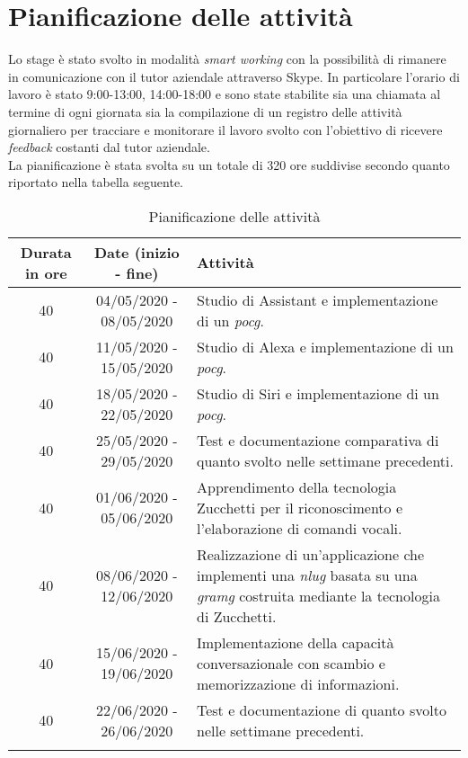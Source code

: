 \section{Pianificazione delle attività}
Lo stage è stato svolto in modalità \emph{smart working} con la possibilità di rimanere in comunicazione con il tutor aziendale attraverso Skype. In particolare l'orario di lavoro è stato 9:00-13:00, 14:00-18:00 e sono state stabilite sia una chiamata al termine di ogni giornata sia la compilazione di un registro delle attività giornaliero per tracciare e monitorare il lavoro svolto con l'obiettivo di ricevere \emph{feedback} costanti dal tutor aziendale. \\
La pianificazione è stata svolta su un totale di 320 ore suddivise secondo quanto riportato nella tabella seguente.
\begin{longtable}{|c|c|p{5.5cm}|}
		\hline
		\textbf{Durata in ore} & \textbf{Date (inizio - fine)} & \textbf{Attività} \\\hline
		
		40 & 04/05/2020 - 08/05/2020 & Studio di Assistant e implementazione di un \emph{\gls{pocg}}. \\
		\hline
		40 & 11/05/2020 - 15/05/2020 & Studio di Alexa e implementazione di un \emph{\gls{pocg}}. \\
		\hline
		40 & 18/05/2020 - 22/05/2020 & Studio di Siri e implementazione di un \emph{\gls{pocg}}. \\
		\hline
		40 & 25/05/2020 - 29/05/2020 & Test e documentazione comparativa di quanto svolto nelle settimane precedenti. \\
		\hline
		40 & 01/06/2020 - 05/06/2020 & Apprendimento della tecnologia Zucchetti per il riconoscimento e l'elaborazione di comandi vocali. \\
		\hline
		40 & 08/06/2020 - 12/06/2020 & Realizzazione di un'applicazione che implementi una \emph{\gls{nlug}} basata su una \emph{\gls{gramg}} costruita mediante la tecnologia di Zucchetti. \\
		\hline
		40 & 15/06/2020 - 19/06/2020 & Implementazione della capacità conversazionale con scambio e memorizzazione di informazioni. \\
		\hline
		40 & 22/06/2020 - 26/06/2020 & Test e documentazione di quanto svolto nelle settimane precedenti. \\	
		\hline
	\caption{Pianificazione delle attività}
\end{longtable}


